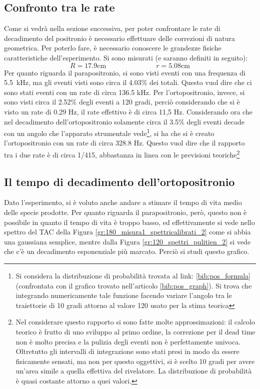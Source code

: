 \subsection{Confronto tra le rate}
Come si vedrà nella sezione successiva, per poter confrontare le rate di decadimento del positronio è necessario effettuare delle correzioni di natura geometrica. Per poterlo
fare, è necessario conoscere le grandezze fisiche caratteristiche dell'esperimento. Si sono misurati (e saranno definiti in seguito):
$$R = 17.9 \text{cm} \hspace{3cm} r =5.08 \text{cm}$$
Per quanto riguarda il parapositronio, si sono visti eventi con una frequenza di 5.5~kHz, ma gli eventi visti sono circa il 4.03\% dei totali. Questo vuol dire che 
ci sono stati eventi con un rate di circa 136.5 kHz. Per l'ortopositronio, invece, si sono visti circa il 2.52\% degli eventi a 120 gradi,
perciò considerando che si è visto un rate
di 0.29 Hz, il rate effettivo è di circa 11,5 Hz. Considerando ora che nel decadimento dell'ortopositronio solamente circa il 3.5\% degli eventi decade con un
angolo che l'apparato strumentale vede\footnote{Si considera la distribuzione di probabilità trovata al link:
\ref{bib:pos_formula} (confrontata con il grafico trovato nell'articolo \ref{bib:pos_graph}).
Si trova che integrando numericamente tale funzione facendo variare l'angolo tra le traiettorie di 10 gradi attorno al valore 120 usato per la stima teorica},
si ha che si è creato l'ortopositronio con un rate di circa 328.8 Hz. Questo vuol dire che il rapporto tra i due rate è di circa 1/415, abbastanza in linea con le previsioni
teoriche\footnote{Nel considerare questo rapporto si sono fatte molte approssimazioni: il calcolo teorico è frutto di uno sviluppo al primo ordine, la correzione per il
dead time non è molto precisa e la pulizia degli eventi non è perfettamente univoca. Oltretutto gli intervalli di integrazione sono stati presi in modo da essere fisicamente
sensati, ma non per questo oggettivi, si è scelto 10 gradi per avere un'area simile a quella effettiva del rivelatore. La distribuzione di probabilità è quasi costante
attorno a quei valori.}

\FloatBarrier
\subsection{Il tempo di decadimento dell'ortopositronio}
Dato l'esperimento, si è voluto anche andare a stimare il tempo di vita medio delle specie prodotte. Per quanto riguarda il parapositronio, però, questo non è
possibile in quanto il tempo di vita è troppo basso, ed effettivamente si vede nello spettro del TAC della Figura \ref{gr:180_misura1_spettricalibrati_2} come si
abbia una gaussiana semplice, mentre dalla Figura \ref{gr:120_spettri_pulitien_2} si vede che c'è un decadimento esponenziale più marcato. Perciò si studi questo
grafico.\\

